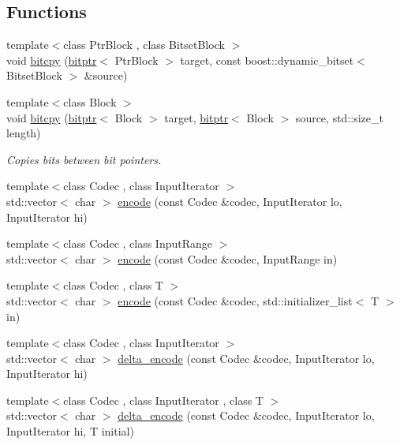 \subsection*{Functions}
\begin{DoxyCompactItemize}
\item 
{\footnotesize template$<$class Ptr\+Block , class Bitset\+Block $>$ }\\void \mbox{\hyperlink{namespaceirk_ae79f958d4bca4bb9e05628261f2fb725}{bitcpy}} (\mbox{\hyperlink{classirk_1_1bitptr}{bitptr}}$<$ Ptr\+Block $>$ target, const boost\+::dynamic\+\_\+bitset$<$ Bitset\+Block $>$ \&source)
\item 
{\footnotesize template$<$class Block $>$ }\\void \mbox{\hyperlink{namespaceirk_a339a0543200e91f59773f625063c959c}{bitcpy}} (\mbox{\hyperlink{classirk_1_1bitptr}{bitptr}}$<$ Block $>$ target, \mbox{\hyperlink{classirk_1_1bitptr}{bitptr}}$<$ Block $>$ source, std\+::size\+\_\+t length)
\begin{DoxyCompactList}\small\item\em Copies bits between bit pointers. \end{DoxyCompactList}\item 
{\footnotesize template$<$class Codec , class Input\+Iterator $>$ }\\std\+::vector$<$ char $>$ \mbox{\hyperlink{namespaceirk_abb9d919900c25d5bd3ffc5c25343fc96}{encode}} (const Codec \&codec, Input\+Iterator lo, Input\+Iterator hi)
\item 
{\footnotesize template$<$class Codec , class Input\+Range $>$ }\\std\+::vector$<$ char $>$ \mbox{\hyperlink{namespaceirk_a59d242b9679dbc0d8fe61f1b72a7d5a2}{encode}} (const Codec \&codec, Input\+Range in)
\item 
{\footnotesize template$<$class Codec , class T $>$ }\\std\+::vector$<$ char $>$ \mbox{\hyperlink{namespaceirk_a22868b0491ea12fc4716da3970addc14}{encode}} (const Codec \&codec, std\+::initializer\+\_\+list$<$ T $>$ in)
\item 
{\footnotesize template$<$class Codec , class Input\+Iterator $>$ }\\std\+::vector$<$ char $>$ \mbox{\hyperlink{namespaceirk_a896bdd772f368d7c786993c1fce4c189}{delta\+\_\+encode}} (const Codec \&codec, Input\+Iterator lo, Input\+Iterator hi)
\item 
{\footnotesize template$<$class Codec , class Input\+Iterator , class T $>$ }\\std\+::vector$<$ char $>$ \mbox{\hyperlink{namespaceirk_a8cf4a588f3d7bb35497c272e13e11cc8}{delta\+\_\+encode}} (const Codec \&codec, Input\+Iterator lo, Input\+Iterator hi, T initial)

\end{DoxyCompactItemize}
